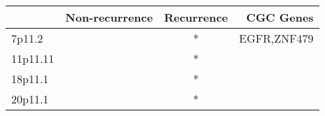 \begin{tabular}{lccr}
\toprule
{} & Non-recurrence & Recurrence &    CGC Genes \\
\midrule
7p11.2   &                &          * &  EGFR,ZNF479 \\
11p11.11 &                &          * &              \\
18p11.1  &                &          * &              \\
20p11.1  &                &          * &              \\
\bottomrule
\end{tabular}

